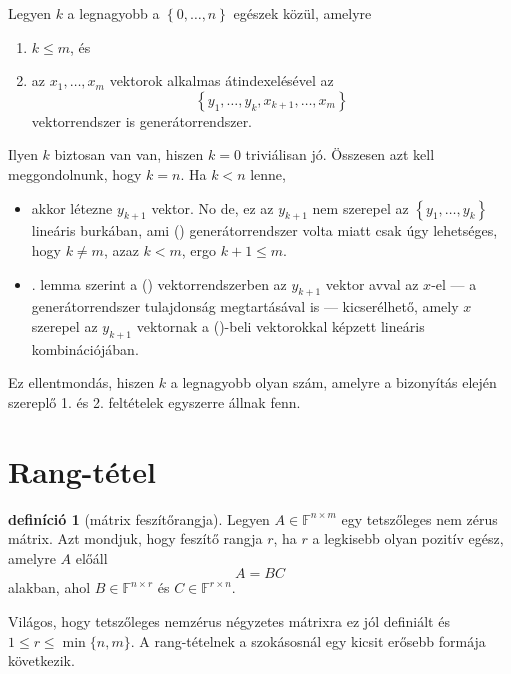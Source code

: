 \documentclass[9pt, showtrims]{memoir}
\makeatletter
\let\Aref\relax
\renewenvironment{proof}[1][\proofname]
    {\par\pushQED{\qed}%
    \normalfont \topsep6\p@\@plus6\p@\relax
    \trivlist
    \item[\hskip\labelsep
        \itshape
    #1\@addpunct{:}]\ignorespaces}
    {\popQED\endtrivlist\@endpefalse}
\theoremstyle{plain}
\theoremstyle{remark}
\theoremstyle{definition}
\newtheorem{definition}[proposition]{definíció}
\renewcommand{\mathbf}{\mathbb}
\makeatother
\begin{document}
\begin{proof}
    Legyen $k$ a legnagyobb a $\left\{ 0,\dots,n \right\}$ egészek közül, amelyre
    \begin{enumerate}
        \item $k\leq m$, és
        \item az $x_1,\dots,x_m$ vektorok alkalmas átindexelésével az
            \[
                \left\{ y_1,\dots,y_k,x_{k+1},\dots,x_m \right\}\tag{\dag}
            \]
            vektorrendszer is generátorrendszer.
    \end{enumerate}
    Ilyen $k$ biztosan van van, hiszen $k=0$ triviálisan jó.
    Összesen azt kell meggondolnunk, hogy $k=n$.
    Ha $k<n$ lenne, 
    \begin{itemize}
        \item 
            akkor létezne $y_{k+1}$ vektor.
            No de, ez az $y_{k+1}$ nem szerepel az $\left\{ y_1,\dots,y_k \right\}$ lineáris burkában,
            ami (\dag) generátorrendszer volta miatt csak úgy lehetséges, 
            hogy $k\neq m$, azaz $k<m$, ergo $k+1\leq m$.
        \item
            \Aref{le:gencsere}. lemma szerint a (\dag) vektorrendszerben az $y_{k+1}$ vektor 
            avval az $x$-el
            --- a generátorrendszer tulajdonság megtartásával is --- 
            kicserélhető, 
            amely $x$ szerepel az $y_{k+1}$ vektornak a (\dag)-beli
            vektorokkal képzett lineáris kombinációjában. 
    \end{itemize}
    Ez ellentmondás, hiszen $k$ a legnagyobb olyan szám, 
    amelyre a bizonyítás elején szereplő 1. és 2. feltételek egyszerre állnak fenn.
\end{proof}
\section{Rang-tétel}
\begin{definition}[mátrix feszítőrangja]
    Legyen $A\in\mathbf{F}^{n\times m}$ egy tetszőleges nem zérus mátrix.
    Azt mondjuk, hogy feszítő rangja $r$, ha $r$ a legkisebb olyan pozitív egész, amelyre $A$ előáll
    \[
        A=BC
    \]
    alakban, ahol $B\in\mathbf{F}^{n\times r}$ és $C\in\mathbb{F}^{r\times n}$.
\end{definition}
Világos, hogy tetszőleges nemzérus négyzetes mátrixra ez jól definiált és $1\leq r \leq \min\{n,m\}$.
A rang-tételnek a szokásosnál egy kicsit erősebb formája következik.
\end{document}
